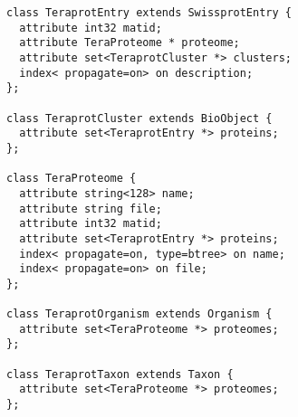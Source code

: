 \begin{verbatim}
class TeraprotEntry extends SwissprotEntry {
  attribute int32 matid;
  attribute TeraProteome * proteome;
  attribute set<TeraprotCluster *> clusters;
  index< propagate=on> on description;
};

class TeraprotCluster extends BioObject {
  attribute set<TeraprotEntry *> proteins;
};

class TeraProteome {
  attribute string<128> name;
  attribute string file;
  attribute int32 matid;
  attribute set<TeraprotEntry *> proteins;
  index< propagate=on, type=btree> on name;
  index< propagate=on> on file;
};

class TeraprotOrganism extends Organism {
  attribute set<TeraProteome *> proteomes;
};

class TeraprotTaxon extends Taxon {
  attribute set<TeraProteome *> proteomes;
};
\end{verbatim}


